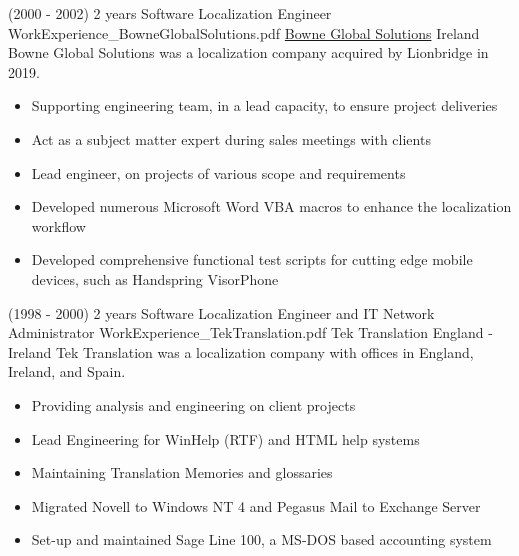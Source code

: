 \begin{twenty}
\twentyitem
  {(2000 - 2002) 2 years}
  {Software Localization Engineer}
  {WorkExperience_BowneGlobalSolutions.pdf}
  {\href{https://www.lionbridge.com/}{Bowne Global Solutions}}
  {Ireland}
  {Bowne Global Solutions was a localization company acquired by Lionbridge in 2019.}
  {\begin{itemize}
    \item Supporting engineering team, in a lead capacity, to ensure project deliveries
    \item Act as a subject matter expert during sales meetings with clients
    \item Lead engineer, on projects of various scope and requirements
  \end{itemize}}
  {\begin{itemize}
    \item Developed numerous Microsoft Word VBA macros to enhance the localization workflow
    \item Developed comprehensive functional test scripts for cutting edge mobile devices, such as Handspring VisorPhone
  \end{itemize}}
\end{twenty}

\begin{twenty}
\twentyitem
  {(1998 - 2000) 2 years}
  {Software Localization Engineer and IT Network Administrator}
  {WorkExperience_TekTranslation.pdf}
  {Tek Translation}
  {England - Ireland}
  {Tek Translation was a localization company with offices in England, Ireland, and Spain.}
  {\begin{itemize}
    \item Providing analysis and engineering on client projects
    \item Lead Engineering for WinHelp (RTF) and HTML help systems
    \item Maintaining Translation Memories and glossaries
  \end{itemize}}
  {\begin{itemize}
    \item Migrated Novell to Windows NT 4 and Pegasus Mail to Exchange Server
    \item Set-up and maintained Sage Line 100, a MS-DOS based accounting system
  \end{itemize}}
\end{twenty}
